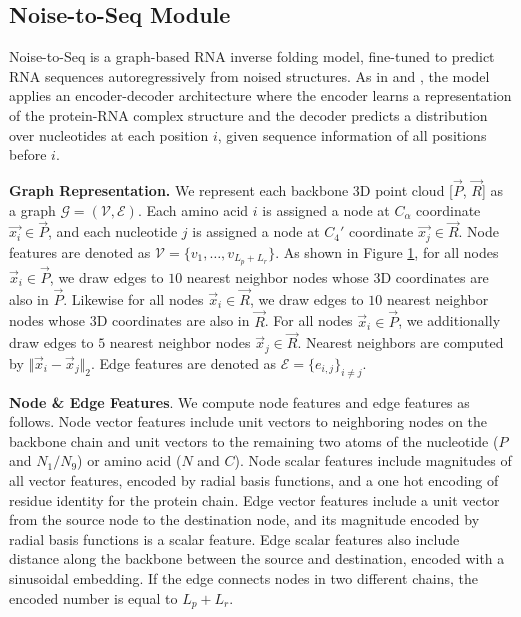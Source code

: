 \subsection{Noise-to-Seq Module}
\label{sec:3.2}

Noise-to-Seq is a graph-based RNA inverse folding model, fine-tuned to predict RNA sequences autoregressively from noised structures. As in \citet{ingraham2019generative} and \citet{jing2021equivariant}, the model applies an encoder-decoder architecture where the encoder learns a representation of the protein-RNA complex structure and the decoder predicts a distribution over nucleotides at each position $i$, given sequence information of all positions before $i$.

\textbf{Graph Representation.} We represent each backbone 3D point cloud [$\vec P$, $\vec R$] as a graph $\mathcal{G} = (\mathcal{V}, \mathcal{E})$. Each amino acid $i$ is assigned a node at $C_\alpha$ coordinate $\vec{x_i} \in \vec P$, and each nucleotide $j$ is assigned a node at $C_{4}'$ coordinate $\vec{x_j} \in \vec R$. Node features are denoted as $\mathcal{V} = \{ v_1, \ldots, v_{L_p + L_r} \}$. As shown in Figure \hyperref[fig:1]{1}, for all nodes $\vec{x}_i \in \vec P$, we draw edges to $10$ nearest neighbor nodes whose 3D coordinates are also in $\vec P$. Likewise for all nodes $\vec{x}_i \in \vec R$, we draw edges to $10$ nearest neighbor nodes whose 3D coordinates are also in $\vec R$. For all nodes $\vec{x}_i \in \vec P$, we additionally draw edges to $5$ nearest neighbor nodes $\vec{x}_j \in \vec R$. Nearest neighbors are computed by $\Vert \vec{x}_i - \vec{x}_j \Vert_2$. Edge features are denoted as $\mathcal{E} = \{ e_{i,j} \}_{i \neq j}$.

\textbf{Node \& Edge Features}. We compute node features and edge features as follows. Node vector features include unit vectors to neighboring nodes on the backbone chain and unit vectors to the remaining two atoms of the nucleotide ($P$ and $N_{1}/N_{9}$) or amino acid ($N$ and $C$). Node scalar features include magnitudes of all vector features, encoded by radial basis functions, and a one hot encoding of residue identity for the protein chain. Edge vector features include a unit vector from the source node to the destination node, and its magnitude encoded by radial basis functions is a scalar feature. Edge scalar features also include distance along the backbone between the source and destination, encoded with a sinusoidal embedding. If the edge connects nodes in two different chains, the encoded number is equal to $L_p+L_r$.

